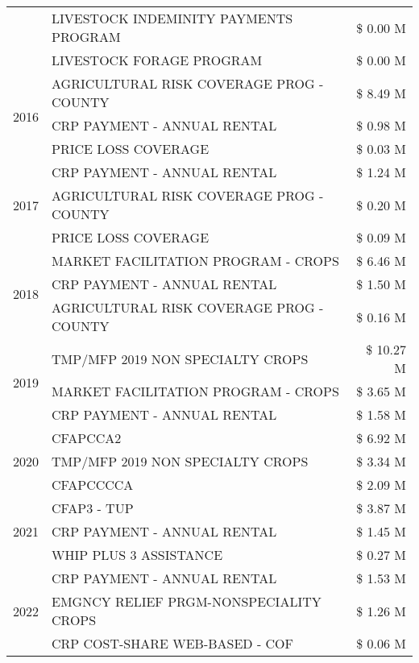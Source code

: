 \begin{tabular}{llr}
 & LIVESTOCK INDEMINITY PAYMENTS PROGRAM & \$ 0.00 M \\
 & LIVESTOCK FORAGE PROGRAM & \$ 0.00 M \\
\cline{1-3}
\multirow[t]{3}{*}{2016} & AGRICULTURAL RISK COVERAGE PROG - COUNTY & \$ 8.49 M \\
 & CRP PAYMENT - ANNUAL RENTAL & \$ 0.98 M \\
 & PRICE LOSS COVERAGE & \$ 0.03 M \\
\cline{1-3}
\multirow[t]{3}{*}{2017} & CRP PAYMENT - ANNUAL RENTAL & \$ 1.24 M \\
 & AGRICULTURAL RISK COVERAGE PROG - COUNTY & \$ 0.20 M \\
 & PRICE LOSS COVERAGE & \$ 0.09 M \\
\cline{1-3}
\multirow[t]{3}{*}{2018} & MARKET FACILITATION PROGRAM - CROPS & \$ 6.46 M \\
 & CRP PAYMENT - ANNUAL RENTAL & \$ 1.50 M \\
 & AGRICULTURAL RISK COVERAGE PROG - COUNTY & \$ 0.16 M \\
\cline{1-3}
\multirow[t]{3}{*}{2019} & TMP/MFP 2019 NON SPECIALTY CROPS & \$ 10.27 M \\
 & MARKET FACILITATION PROGRAM - CROPS & \$ 3.65 M \\
 & CRP PAYMENT - ANNUAL RENTAL & \$ 1.58 M \\
\cline{1-3}
\multirow[t]{3}{*}{2020} & CFAPCCA2 & \$ 6.92 M \\
 & TMP/MFP 2019 NON SPECIALTY CROPS & \$ 3.34 M \\
 & CFAPCCCCA & \$ 2.09 M \\
\cline{1-3}
\multirow[t]{3}{*}{2021} & CFAP3 - TUP & \$ 3.87 M \\
 & CRP PAYMENT - ANNUAL RENTAL & \$ 1.45 M \\
 & WHIP PLUS 3 ASSISTANCE & \$ 0.27 M \\
\cline{1-3}
\multirow[t]{3}{*}{2022} & CRP PAYMENT - ANNUAL RENTAL & \$ 1.53 M \\
 & EMGNCY RELIEF PRGM-NONSPECIALITY CROPS & \$ 1.26 M \\
 & CRP COST-SHARE WEB-BASED - COF & \$ 0.06 M \\
\cline{1-3}
\bottomrule
\end{tabular}

